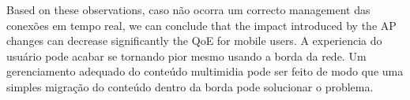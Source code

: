 Based on these observations, caso não ocorra um correcto management das conexões em tempo real,  we can conclude that the impact introduced by the AP changes can decrease significantly the QoE for mobile users. A experiencia do usuário pode acabar se tornando pior mesmo usando a borda da rede. Um gerenciamento adequado do conteúdo multimidia pode ser feito de modo que uma simples migração do conteúdo dentro da borda pode solucionar o problema.















































